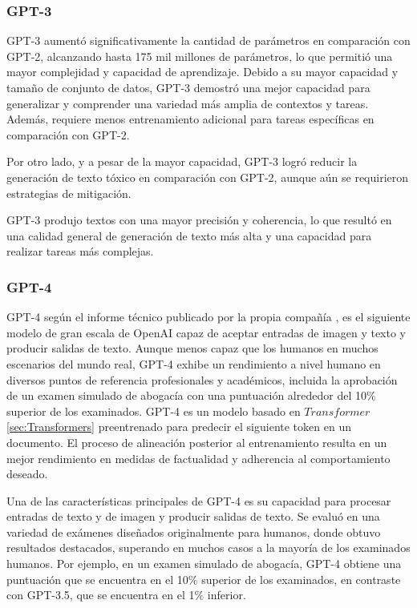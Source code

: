 \subsubsection{GPT-3}
GPT-3 aumentó significativamente la cantidad de parámetros en comparación con GPT-2, alcanzando hasta 175 mil millones de parámetros, lo que permitió una mayor complejidad y capacidad de aprendizaje. Debido a su mayor capacidad y tamaño de conjunto de datos, GPT-3 demostró una mejor capacidad para generalizar y comprender una variedad más amplia de contextos y tareas. Además, requiere menos entrenamiento adicional para tareas específicas en comparación con GPT-2.

Por otro lado, y a pesar de la mayor capacidad, GPT-3 logró reducir la generación de texto tóxico en comparación con GPT-2, aunque aún se requirieron estrategias de mitigación.

GPT-3 produjo textos con una mayor precisión y coherencia, lo que resultó en una calidad general de generación de texto más alta y una capacidad para realizar tareas más complejas.
\subsubsection{GPT-4}
GPT-4 según el informe técnico publicado por la propia compañía \citep{GPT4}, es el siguiente modelo de gran escala de OpenAI capaz de aceptar entradas de imagen y texto y producir salidas de texto. Aunque menos capaz que los humanos en muchos escenarios del mundo real, GPT-4 exhibe un rendimiento a nivel humano en diversos puntos de referencia profesionales y académicos, incluida la aprobación de un examen simulado de abogacía con una puntuación alrededor del 10$\%$ superior de los examinados. GPT-4 es un modelo basado en $Transformer$ \ref{sec:Transformers} preentrenado para predecir el siguiente token en un documento. El proceso de alineación posterior al entrenamiento resulta en un mejor rendimiento en medidas de factualidad y adherencia al comportamiento deseado.

Una de las características principales de GPT-4 es su capacidad para procesar entradas de texto y de imagen y producir salidas de texto. Se evaluó en una variedad de exámenes diseñados originalmente para humanos, donde obtuvo resultados destacados, superando en muchos casos a la mayoría de los examinados humanos. Por ejemplo, en un examen simulado de abogacía, GPT-4 obtiene una puntuación que se encuentra en el 10$\%$ superior de los examinados, en contraste con GPT-3.5, que se encuentra en el 1$\%$ inferior.

